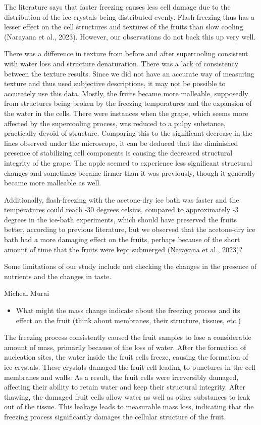 The literature says that faster freezing causes less cell damage due to
the distribution of the ice crystals being distributed evenly. Flash
freezing thus has a lesser effect on the cell structures and textures of
the fruits than slow cooling (Narayana et al., 2023). However, our
observations do not back this up very well.

There was a difference in texture from before and after supercooling
consistent with water loss and structure denaturation. There was a lack
of consistency between the texture results. Since we did not have an
accurate way of measuring texture and thus used subjective descriptions,
it may not be possible to accurately use this data. Mostly, the fruits
became more malleable, supposedly from structures being broken by the
freezing temperatures and the expansion of the water in the cells. There
were instances when the grape, which seems more affected by the
supercooling process, was reduced to a pulpy substance, practically
devoid of structure. Comparing this to the significant decrease in the
lines observed under the microscope, it can be deduced that the
diminished presence of stabilizing cell components is causing the
decreased structural integrity of the grape. The apple seemed to
experience less significant structural changes and sometimes became
firmer than it was previously, though it generally became more malleable
as well.

Additionally, flash-freezing with the acetone-dry ice bath was faster
and the temperatures could reach -30 degrees celsius, compared to
approximately -3 degrees in the ice-bath experiments, which should have
preserved the fruits better, according to previous literature, but we
observed that the acetone-dry ice bath had a more damaging effect on the
fruits, perhaps because of the short amount of time that the fruits were
kept submerged (Narayana et al., 2023)?

Some limitations of our study include not checking the changes in the
presence of nutrients and the changes in taste.

Micheal Murai

\begin{itemize}
\item
  What might the mass change indicate about the freezing process and its
  effect on the fruit (think about membranes, their structure, tissues,
  etc.)
\end{itemize}

The freezing process consistently caused the fruit samples to lose a
considerable amount of mass, primarily because of the loss of water.
After the formation of nucleation sites, the water inside the fruit
cells freeze, causing the formation of ice crystals. These crystals
damaged the fruit cell leading to punctures in the cell membranes and
walls. As a result, the fruit cells were irreversibly damaged, affecting
their ability to retain water and keep their structural integrity. After
thawing, the damaged fruit cells allow water as well as other substances
to leak out of the tissue. This leakage leads to measurable mass loss,
indicating that the freezing process significantly damages the cellular
structure of the fruit.

